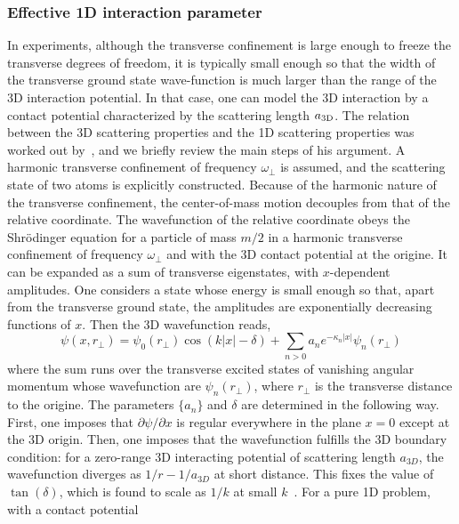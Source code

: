 \documentclass[onecolumn,amsfonts,showpacs,superscriptaddress]{revtex4-1}
\begin{document}
\subsubsection{Effective 1D interaction parameter}
\label{subsec:olshanii}
In experiments, although the transverse confinement is large enough to freeze the transverse degrees of freedom, it is typically small enough so
that the width of the transverse ground state wave-function is much larger than
the range of the 3D interaction potential. In that case, one can
model the 3D interaction by a contact potential characterized by the
scattering length $a_{{\rm 3D}}$. 
The relation between the 3D scattering properties and the 1D scattering properties
was worked out by~\cite{olshanii_atomic_1998}, and we briefly review the main steps of his argument.
A harmonic transverse confinement of frequency $\omega_\perp$
is assumed, and the scattering state of two atoms is explicitly constructed. Because of the harmonic nature of the transverse confinement, the center-of-mass motion decouples from  that of  %
the relative coordinate. The wavefunction of the relative coordinate  obeys the Shr\"odinger equation for a particle of mass $m/2$ in a harmonic 
transverse confinement of frequency $\omega_\perp$ and with
the 3D contact potential at the origine. It can be expanded as a sum of transverse eigenstates, with $x$-dependent 
amplitudes. 
One considers a state whose energy is small enough so that,
apart from the transverse ground state, the amplitudes are exponentially decreasing functions of $x$. Then the 3D wavefunction reads, 
\begin{equation}
    \label{eq:expansion_harmonic_transv}
    \psi(x,r_\perp)=\psi_0(r_\perp)\cos(k|x|-\delta)+\sum_{n>0} a_n e^{-\kappa_n |x|}\psi_n(r_\perp)
\end{equation}
where the sum runs over the transverse excited states of vanishing angular momentum whose wavefunction are $\psi_n(r_\perp)$, where $r_\perp$ is 
the transverse distance to the origine. The parameters $\{a_n\}$ and $\delta$ are determined in the following way.
First, one imposes that $\partial \psi/\partial x$ is regular everywhere in the plane $x=0$ except at the 3D origin. Then, one  imposes
that the wavefunction fulfills the 3D boundary condition: for a zero-range 3D interacting potential of scattering length $a_{3D}$, the 
wavefunction diverges as $1/r-1/a_{3D}$ at short distance. This fixes the value of $\tan(\delta)$, which is found to scale as $1/k$ at small $k$~\citep{olshanii_atomic_1998}. For a pure 1D problem, with a contact potential 
\end{document}
